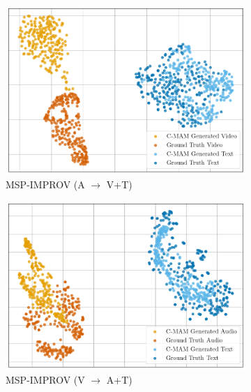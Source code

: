 \begin{figure}[!p]
\begin{subfigure}[b]{0.24\textwidth}
        \includegraphics[width=\textwidth]{imgs/tsne/mmin/msp_improv/cmam_audio_tsne.png}
        \caption*{MSP-IMPROV (A $\rightarrow$ V+T)}
    \end{subfigure}
    \begin{subfigure}[b]{0.24\textwidth}
        \centering
        \includegraphics[width=\textwidth]{imgs/tsne/mmin/msp_improv/cmam_video_tsne.png}
        \caption*{MSP-IMPROV (V $\rightarrow$ A+T)}
    \end{subfigure}
    \begin{subfigure}[b]{0.24\textwidth}
        \centering

\end{subfigure}
\end{figure}
